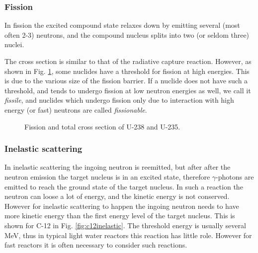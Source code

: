 \subsubsection*{Fission}

In fission the excited compound state relaxes down by emitting several (most often 2-3) neutrons, and the compound nucleus splits into two (or seldom three) nuclei. 

The cross section is similar to that of the radiative capture reaction. However, as shown in Fig. \ref{fig:ufission}, some nuclides have a threshold for fission at high energies. This is due to the various size of the fission barrier. If a nuclide does not have such a threshold, and tends to undergo fission at low neutron energies as well, we call it \textit{fissile}, and nuclides which undergo fission only due to interaction with high energy (or fast) neutrons are called \textit{fissionable}.

\begin{figure}[ht!]
\protect {}\protect
\caption{\label{fig:ufission} \footnotesize{Fission and total cross section of U-238 and U-235.}}
\end{figure}

\subsubsection*{Inelastic scattering}

In inelastic scattering the ingoing neutron is reemitted, but after after the neutron emission the target nucleus is in an excited state, therefore $\gamma$-photons are emitted to reach the ground state of the target nucleus. In such a reaction the neutron can loose a lot of energy, and the kinetic energy is not conserved. However for inelastic scattering to happen the ingoing neutron needs to have more kinetic energy than the first energy level of the target nucleus. This is shown for C-12 in Fig. \ref{fig:c12inelastic}. The threshold energy is usually several MeV, thus in typical light water reactors this reaction has little role. However for fast reactors it is often necessary to consider such reactions.

